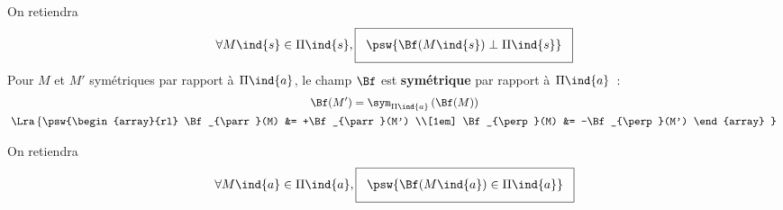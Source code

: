 \documentclass[../../main/main.tex]{subfiles}
\begin{document}
\begin{tcb*}
\begin{isd}[sidebyside align=top]
\begin{center}
{      }
    \end{center}
    On retiendra
    \[
		\setlength{\fboxsep}{3mm}
        \forall M\ind{s} \in \Pi\ind{s},
        \boxed{
          \psw{%
            \Bf (M\ind{s}) \perp \Pi\ind{s}
          }%
        }
    \]
    \tcblower
    Pour $M$ et $M'$ symétriques par rapport à $\Pi\ind{a}$, le champ $\Bf$ est
    \textbf{symétrique} par rapport à $\Pi\ind{a}$~:
    \begin{gather*}
      \Bf(M') = \sym_{\Pi\ind{a}} \left(\Bf(M)\right)
      \\\Lra
      \left\{ 
        \psw{%
                \begin{array}{rl}
                \Bf_{\parr}(M) &= +\Bf_{\parr}(M')
                \\[1em]
                \Bf_{\perp}(M) &= -\Bf_{\perp}(M')
              \end{array}
        }%
       \right.
    \end{gather*}
    \begin{center}
    \end{center}
    On retiendra
    \[
		\setlength{\fboxsep}{3mm}
        \forall M\ind{a} \in \Pi\ind{a},
        \boxed{
          \psw{%
            \Bf (M\ind{a}) \in \Pi\ind{a}
          }%
        }
    \]
  \end{isd}
\end{tcb*}
\end{document}
